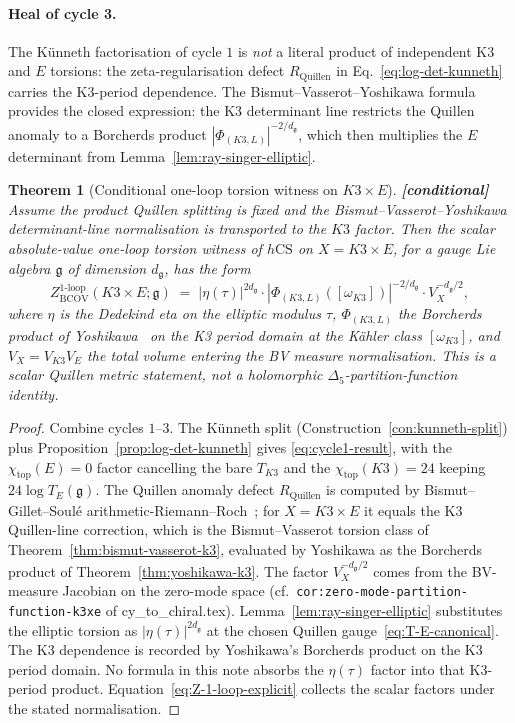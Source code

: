\documentclass[11pt]{article}
\newtheorem{theorem}{Theorem}[section]
\theoremstyle{definition}
\providecommand{\frakg}{\mathfrak{g}}
\providecommand{\hCS}{h\mathrm{CS}}
\providecommand{\BCOV}{\mathrm{BCOV}}
\providecommand{\oneloop}{\mathrm{loop}}
\providecommand{\ClaimStatusConditional}[1][]{\textbf{[conditional]}}
\begin{document}
\paragraph{Heal of cycle 3.} The K\"unneth factorisation of cycle $1$ is
{\em not\/} a literal product of independent K3 and $E$ torsions: the
zeta-regularisation defect $R_{\mathrm{Quillen}}$ in
Eq.~\eqref{eq:log-det-kunneth} carries the K3-period dependence. The
Bismut--Vasserot--Yoshikawa formula provides the closed expression: the
K3 determinant line restricts the Quillen anomaly to a Borcherds product
$|\Phi_{(K3,L)}|^{-2/d_\frakg}$, which then multiplies the $E$
determinant from Lemma~\ref{lem:ray-singer-elliptic}.

\begin{theorem}[Conditional one-loop torsion witness on $K3\times E$]
\label{thm:Z-1-loop-explicit}
\ClaimStatusConditional{}
Assume the product Quillen splitting is fixed and the
Bismut--Vasserot--Yoshikawa determinant-line normalisation is transported
to the $K3$ factor. Then the scalar absolute-value one-loop torsion
witness of $\hCS$ on $X = K3\times E$, for a gauge Lie algebra $\frakg$
of dimension $d_\frakg$, has the form
\begin{equation}
\label{eq:Z-1-loop-explicit}
Z^{1\text{-}\oneloop}_{\BCOV}(K3\times E;\frakg)
\;=\; |\eta(\tau)|^{2d_\frakg}\cdot
|\Phi_{(K3,L)}([\omega_{K3}])|^{-2/d_\frakg}\cdot V_X^{-d_\frakg/2},
\end{equation}
where $\eta$ is the Dedekind eta on the elliptic modulus $\tau$,
$\Phi_{(K3,L)}$ the Borcherds product of Yoshikawa~\cite{Yoshikawa2004}
on the K3 period domain at the K\"ahler class $[\omega_{K3}]$, and
$V_X = V_{K3}V_E$ the total volume entering the BV measure normalisation.
This is a scalar Quillen metric statement, not a holomorphic
$\Delta_5$-partition-function identity.
\end{theorem}

\begin{proof}
Combine cycles $1$--$3$. The K\"unneth split
(Construction~\ref{con:kunneth-split}) plus
Proposition~\ref{prop:log-det-kunneth} gives
\eqref{eq:cycle1-result}, with the $\chi_{\mathrm{top}}(E) = 0$
factor cancelling the bare $T_{K3}$ and the $\chi_{\mathrm{top}}(K3) =
24$ keeping $24\log T_E(\frakg)$. The Quillen anomaly defect
$R_{\mathrm{Quillen}}$ is computed by Bismut--Gillet--Soul\'e
arithmetic-Riemann--Roch~\cite{BGS1988}; for $X = K3\times E$ it equals the
K3 Quillen-line correction, which is the Bismut--Vasserot
torsion class of Theorem~\ref{thm:bismut-vasserot-k3}, evaluated by
Yoshikawa as the Borcherds product of Theorem~\ref{thm:yoshikawa-k3}.
The factor $V_X^{-d_\frakg/2}$ comes from the BV-measure Jacobian on the
zero-mode space (cf.\ \texttt{cor:zero-mode-partition-function-k3xe} of
cy\_to\_chiral.tex). Lemma~\ref{lem:ray-singer-elliptic} substitutes the
elliptic torsion as $|\eta(\tau)|^{2d_\frakg}$ at the chosen Quillen
gauge~\eqref{eq:T-E-canonical}. The K3 dependence is recorded by
Yoshikawa's Borcherds product on the K3 period domain. No formula in
this note absorbs the $\eta(\tau)$ factor into that K3-period product.
Equation~\eqref{eq:Z-1-loop-explicit} collects the scalar factors under
the stated normalisation.
\end{proof}
\end{document}
